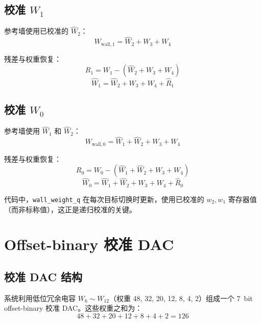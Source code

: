 \documentclass[
  UTF8,
  a4paper,
  11pt,
  oneside,
  fontset=fandol
]{ctexrep}
\newcommand{\code}[1]{\texttt{#1}}
\newcommand{\What}{\widehat{W}}
\newcommand{\Rhat}{\widehat{R}}
\begin{document}
\section{校准 $W_1$}

参考墙使用已校准的 $\What_2$：
\begin{equation}
W_{\mathrm{wall},1} = \What_2 + W_3 + W_4
\end{equation}

残差与权重恢复：
\begin{equation}
R_1 = W_1 - (\What_2 + W_3 + W_4)
\end{equation}
\begin{equation}
\boxed{\What_1 = \What_2 + W_3 + W_4 + \Rhat_1}
\label{eq:What1}
\end{equation}

\section{校准 $W_0$}

参考墙使用 $\What_1$ 和 $\What_2$：
\begin{equation}
W_{\mathrm{wall},0} = \What_1 + \What_2 + W_3 + W_4
\end{equation}

残差与权重恢复：
\begin{equation}
R_0 = W_0 - (\What_1 + \What_2 + W_3 + W_4)
\end{equation}
\begin{equation}
\boxed{\What_0 = \What_1 + \What_2 + W_3 + W_4 + \Rhat_0}
\label{eq:What0}
\end{equation}

代码中，\code{wall\_weight\_q} 在每次目标切换时更新，使用已校准的 $w_2, w_1$ 寄存器值（而非标称值），这正是递归校准的关键。

\chapter{Offset-binary 校准 DAC}

\section{校准 DAC 结构}

系统利用低位冗余电容 $W_6 \sim W_{12}$（权重 48, 32, 20, 12, 8, 4, 2）组成一个 \SI{7}{bit} offset-binary 校准 DAC。这些权重之和为：
\begin{equation}
48 + 32 + 20 + 12 + 8 + 4 + 2 = 126
\end{equation}
\end{document}
